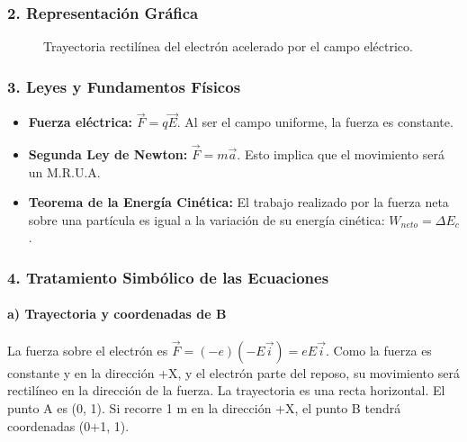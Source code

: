 \subsubsection*{2. Representación Gráfica}
\begin{figure}[H]
    \centering
    \caption{Trayectoria rectilínea del electrón acelerado por el campo eléctrico.}
\end{figure}

\subsubsection*{3. Leyes y Fundamentos Físicos}
\begin{itemize}
    \item \textbf{Fuerza eléctrica:} $\vec{F} = q\vec{E}$. Al ser el campo uniforme, la fuerza es constante.
    \item \textbf{Segunda Ley de Newton:} $\vec{F} = m\vec{a}$. Esto implica que el movimiento será un M.R.U.A.
    \item \textbf{Teorema de la Energía Cinética:} El trabajo realizado por la fuerza neta sobre una partícula es igual a la variación de su energía cinética: $W_{neto} = \Delta E_c$.
\end{itemize}

\subsubsection*{4. Tratamiento Simbólico de las Ecuaciones}
\paragraph{a) Trayectoria y coordenadas de B}
La fuerza sobre el electrón es $\vec{F} = (-e)(-E\vec{i}) = eE\vec{i}$.
Como la fuerza es constante y en la dirección +X, y el electrón parte del reposo, su movimiento será rectilíneo en la dirección de la fuerza. La trayectoria es una recta horizontal.
El punto A es (0, 1). Si recorre 1 m en la dirección +X, el punto B tendrá coordenadas (0+1, 1).

